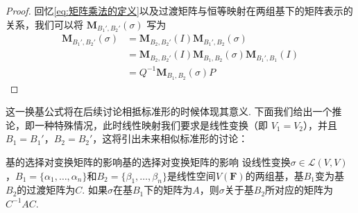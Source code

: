 \begin{proof}
    回忆\autoref{eq:矩阵乘法的定义}以及过渡矩阵与恒等映射在两组基下的矩阵表示的关系，我们可以将 $\mathbf{M}_{B_1',B_2'}(\sigma)$ 写为
    \begin{align*}
        \mathbf{M}_{B_1',B_2'}(\sigma) &= \mathbf{M}_{B_2,B_2'}(I)\mathbf{M}_{B_1',B_2}(\sigma) \\
        &= \mathbf{M}_{B_2,B_2'}(I)\mathbf{M}_{B_1,B_2}(\sigma)\mathbf{M}_{B_1',B_1}(I) \\
        &= Q^{-1} \mathbf{M}_{B_1,B_2}(\sigma)P
    \end{align*}
\end{proof}

这一换基公式将在后续讨论相抵标准形的时候体现其意义. 下面我们给出一个推论，即一种特殊情况，此时线性映射我们要求是线性变换（即 $V_1 = V_2$），并且 $B_1 = B_1'$，$B_2 = B_2'$，这将引出未来相似标准形的讨论：
\begin{theorem}{基的选择对变换矩阵的影响}{基的选择对变换矩阵的影响}
    设线性变换$\sigma \in \mathcal{L}(V,V)$，$B_1=\{\alpha_1,\ldots,\alpha_n\}$和$B_2=\{\beta_1,\ldots,\beta_n\}$是线性空间$V(\mathbf{F})$的两组基，基$B_1$变为基$B_2$的过渡矩阵为$C$. 如果$\sigma$在基$B_1$下的矩阵为$A$，则$\sigma$关于基$B_2$所对应的矩阵为$C^{-1}AC$.
\end{theorem}


